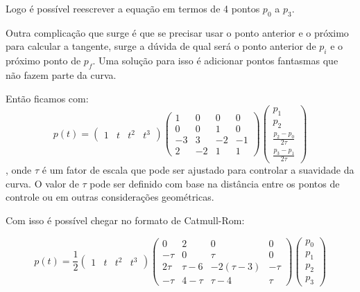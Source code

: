 Logo é possível reescrever a equação em termos de 4 pontos $p_0$ a $p_3$.

Outra complicação que surge é que se precisar usar o ponto anterior e o próximo para calcular a tangente, surge a dúvida de qual será o ponto anterior de $p_i$ e o próximo ponto de $p_f$. Uma solução para isso é adicionar pontos fantasmas que não fazem parte da curva.


Então ficamos com:
\begin{equation}
    p(t) =  
        \left(
        \begin{array}{rrrr}
            1 & t & t^2 & t^3
        \end{array}
        \right)
        \left(
        \begin{array}{rrrr}
            1 & 0 & 0 & 0 \\
            0 & 0 & 1 & 0 \\
            -3 & 3 & -2 & -1 \\
                2 & -2 & 1 & 1
        \end{array}
        \right)
    \left(
        \begin{array}{r}
            p_1 \\
            p_2 \\
            \frac{p_2 - p_0}{2\tau} \\
                \frac{p_3 - p_1}{2\tau}
        \end{array}
        \right)
\end{equation}
, onde $\tau$ é um fator de escala que pode ser ajustado para controlar a suavidade da curva. O valor de $\tau$ pode ser definido com base na distância entre os pontos de controle ou em outras considerações geométricas.

Com isso é possível chegar no formato de Catmull-Rom:

\begin{equation}
    p(t) = \frac{1}{2}
       \left(
 	\begin{array}{rrrr}
 		1 & t & t^2 & t^3
 	\end{array}
    \right)
    \left(
 	\begin{array}{rrrr}
 		0 & 2 & 0 & 0 \\
 	    -\tau & 0 & \tau & 0 \\
 		2\tau & \tau-6 & -2(\tau-3) & -\tau \\
            -\tau & 4-\tau & \tau-4 & \tau
 	\end{array}
    \right)
   \left(
 	\begin{array}{r}
 		p_0 \\
 	    p_1 \\
 		p_2 \\
            p_3
 	\end{array}
    \right)
\end{equation}


